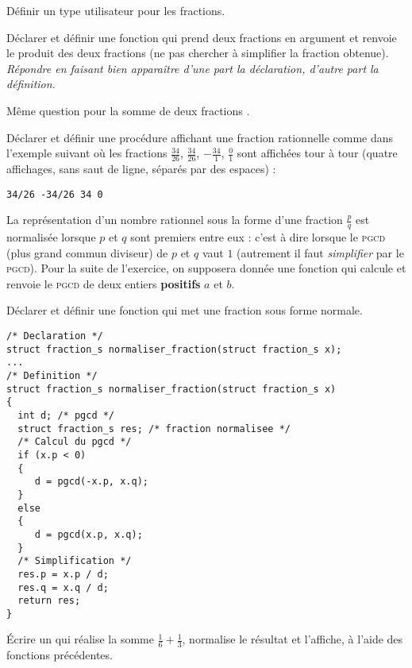 \begin{newenu}
  \item Définir un type utilisateur pour les fractions.
  \item Déclarer et définir une fonction  qui
    prend deux fractions en argument et renvoie le produit des deux
    fractions (ne pas chercher à simplifier la fraction
    obtenue). \emph{Répondre en faisant bien apparaître d'une part la
      déclaration, d'autre part la définition.}
  \item Même question pour la somme de deux fractions
    .
  \item Déclarer et définir une procédure affichant une fraction
    rationnelle comme dans l'exemple suivant où les fractions
    $\frac{34}{26}$, $\frac{34}{26}$, $-\frac{34}{1}$,  $\frac{0}{1}$ sont affichées
    tour à tour (quatre affichages, sans saut de ligne, séparés par des
    espaces) :
\begin{verbatim}
34/26 -34/26 34 0
\end{verbatim}
\end{newenu}

La représentation d'un nombre rationnel sous la forme d'une fraction
$\frac{p}{q}$ est normalisée lorsque $p$ et $q$ sont premiers entre
eux : c'est à dire lorsque le \textsc{pgcd} (plus grand commun
diviseur) de $p$ et $q$ vaut $1$ (autrement il faut \emph{simplifier}
par le \textsc{pgcd}). Pour la suite de l'exercice, on supposera
donnée une fonction  qui calcule et renvoie
le \textsc{pgcd} de deux entiers \textbf{positifs} $a$ et $b$.


\begin{lastenu}
\item Déclarer et définir une fonction  qui
  met une fraction sous forme normale.

  \begin{correction}
\begin{verbatim}
/* Declaration */
struct fraction_s normaliser_fraction(struct fraction_s x);
...
/* Definition */
struct fraction_s normaliser_fraction(struct fraction_s x)
{
  int d; /* pgcd */
  struct fraction_s res; /* fraction normalisee */
  /* Calcul du pgcd */
  if (x.p < 0)
  {
     d = pgcd(-x.p, x.q);
  }
  else
  {
     d = pgcd(x.p, x.q);
  }
  /* Simplification */
  res.p = x.p / d;
  res.q = x.q / d;
  return res;
}
\end{verbatim}
  \end{correction}
\item Écrire un  qui réalise la somme
  $\frac{1}{6} + \frac{1}{3}$, normalise le résultat et
  l'affiche, à l'aide des fonctions précédentes.
\end{lastenu}

